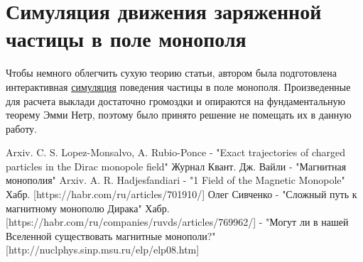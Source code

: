 \documentclass[a4paper, 12pt]{article}
\begin{document}






\section{Симуляция движения заряженной частицы в поле монополя}
Чтобы немного облегчить сухую теорию статьи, автором была подготовлена интерактивная \href{http://139.28.220.13:8501}{симуляция} поведения частицы в поле монополя. Произведенные для расчета выклади достаточно громоздки и опираются на фундаментальную теорему Эмми Нетр, поэтому было принято решение не помещать их в данную работу.

\newpage
 
 
\begin{thebibliography}{}
    \bibitem{}  Arxiv. C. S. Lopez-Monsalvo, A. Rubio-Ponce  -  "Exact trajectories of charged particles in the Dirac
    monopole field"
    \bibitem{}  Журнал Квант. Дж. Вайли  -  "Магнитная монополия"
    \bibitem{}  Arxiv. A. R. Hadjesfandiari  -  "1
    Field of the Magnetic Monopole"
    \bibitem{}  Хабр. [https://habr.com/ru/articles/701910/] Олег Сивченко  -  "Сложный путь к магнитному монополю Дирака"
    \bibitem{}  Хабр. [https://habr.com/ru/companies/ruvds/articles/769962/] - "Могут ли в нашей Вселенной существовать магнитные монополи?"
    \bibitem{} [http://nuclphys.sinp.msu.ru/elp/elp08.htm]

\end{thebibliography}
\end{document}
